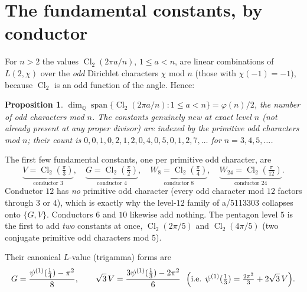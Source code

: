 \documentclass[11pt]{article}
\DeclareMathOperator{\Cl}{Cl}
\theoremstyle{plain}\newtheorem{theorem}{Theorem}\newtheorem{proposition}[theorem]{Proposition}
\theoremstyle{remark}\newtheorem{remark}[theorem]{Remark}
\begin{document}
\section{The fundamental constants, by conductor}
For $n>2$ the values $\Cl_2(2\pi a/n)$, $1\le a<n$, are linear combinations of $L(2,\chi)$ over the
\emph{odd} Dirichlet characters $\chi$ mod $n$ (those with $\chi(-1)=-1$), because $\Cl_2$ is an odd
function of the angle. Hence:
\begin{proposition}\label{prop:dim}
$\dim_{\mathbb Q}\operatorname{span}\{\Cl_2(2\pi a/n):1\le a<n\}=\varphi(n)/2$, the number of odd
characters mod $n$. The constants genuinely new at exact level $n$ (not already present at any proper
divisor) are indexed by the \emph{primitive} odd characters mod $n$; their count is
$0,0,1,0,2,1,2,0,4,0,5,0,1,2,7,\dots$ for $n=3,4,5,\dots$.
\end{proposition}
The first few fundamental constants, one per primitive odd character, are
\[
  \underbrace{V=\Cl_2(\tfrac\pi3)}_{\text{conductor }3},\quad
  \underbrace{G=\Cl_2(\tfrac\pi2)}_{\text{conductor }4},\quad
  \underbrace{W_8=\Cl_2(\tfrac\pi4)}_{\text{conductor }8},\quad
  \underbrace{W_{24}=\Cl_2(\tfrac\pi{12})}_{\text{conductor }24}.
\]
Conductor $12$ has \emph{no} primitive odd character (every odd character mod $12$ factors through $3$ or
$4$), which is exactly why the level-$12$ family of a/5113303 collapses onto $\{G,V\}$. Conductors $6$ and
$10$ likewise add nothing. The pentagon level $5$ is the first to add \emph{two} constants at once,
$\Cl_2(2\pi/5)$ and $\Cl_2(4\pi/5)$ (two conjugate primitive odd characters mod $5$).

Their canonical $L$-value (trigamma) forms are
\begin{equation}\label{eq:trig}
  G=\frac{\psi^{(1)}(\tfrac14)-\pi^2}{8},\qquad
  \sqrt3\,V=\frac{3\psi^{(1)}(\tfrac13)-2\pi^2}{6}\ \ \Bigl(\text{i.e. }\psi^{(1)}(\tfrac13)=\tfrac{2\pi^2}3+2\sqrt3\,V\Bigr).
\end{equation}
\end{document}
